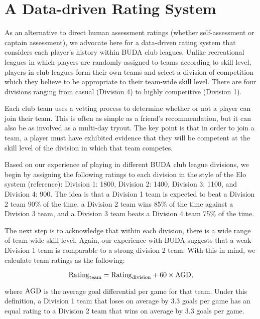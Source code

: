\section{A Data-driven Rating System}\label{sec:club_rating}

As an alternative to direct human assessment ratings (whether self-assessment or captain assessment), we advocate here for a data-driven rating system that considers each player's history within BUDA club leagues. Unlike recreational leagues in which players are randomly assigned to teams according to skill level, players in club leagues form their own teams and select a division of competition which they believe to be appropriate to their team-wide skill level.  There are four divisions ranging from casual (Division 4) to highly competitive (Division 1).

Each club team uses a vetting process to determine whether or not a player can join their team. This is often as simple as a friend's recommendation, but it can also be as involved as a multi-day tryout. The key point is that in order to join a team, a player must have exhibited evidence that they will be competent at the skill level of the division in which that team competes.

Based on our experience of playing in different BUDA club league divisions, we begin by assigning the following ratings to each division in the style of the Elo system (reference): Division 1: 1800, Division 2: 1400, Division 3: 1100, and Division 4: 900.  The idea is that a Division 1 team is expected to beat a Division 2 team 90\% of the time, a Division 2 team wins 85\% of the time against a Division 3 team, and a Division 3 team beats a Division 4 team 75\% of the time.

The next step is to acknowledge that within each division, there is a wide range of team-wide skill level. Again, our experience with BUDA suggests that a weak Division 1 team is comparable to a strong division 2 team.  With this in mind, we calculate team ratings as the following:

\begin{equation}
{\rm Rating}_{\rm team} = {\rm Rating}_{\rm division} + 60 \times {\rm AGD},
\end{equation}

\noindent where ${\rm AGD}$ is the average goal differential per game for that team. Under this definition, a Division 1 team that loses on average by 3.3 goals per game has an equal rating to a Division 2 team that wins on average by 3.3 goals per game.

